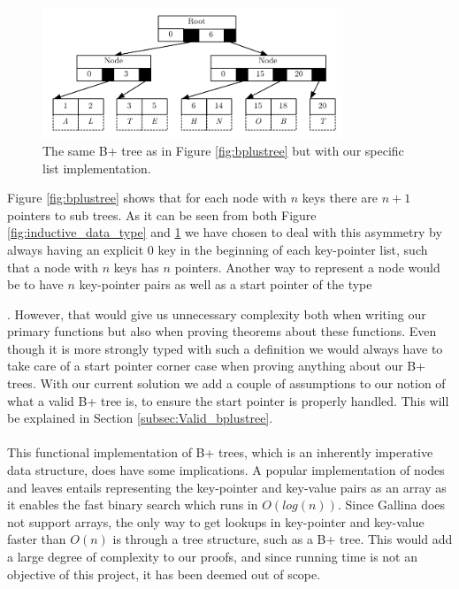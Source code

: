 \begin{figure}
 \centering
   \includegraphics[width=90mm]{diagrams/BPlusTreeImpl.pdf}
 \caption{The same B+ tree as in Figure \ref{fig:bplustree} but with our specific list implementation.}
 \label{fig:bplustreeImpl}
\end{figure}

Figure \ref{fig:bplustree} shows that for each node with $n$ keys there are $n+1$ pointers to sub trees. As it can be seen from both Figure \ref{fig:inductive_data_type} and \ref{fig:bplustreeImpl} we have chosen to deal with this asymmetry by always having an explicit $0$ key in the beginning of each key-pointer list, such that a node with $n$ keys has $n$ pointers. Another way to represent a node would be to have $n$ key-pointer pairs as well as a start pointer of the type \begin{coqdoccode}  \end{coqdoccode}. However, that would give us unnecessary complexity both when writing our primary functions but also when proving theorems about these functions. Even though it is more strongly typed with such a definition we would always have to take care of a start pointer corner case when proving anything about our B+ trees. With our current solution we add a couple of assumptions to our notion of what a valid B+ tree is, to ensure the start pointer is properly handled. This will be explained in Section \ref{subsec:Valid_bplustree}. 

\paragraph{}
This functional implementation of B+ trees, which is an inherently imperative data structure, does have some implications. A popular implementation of nodes and leaves entails representing the key-pointer and key-value pairs as an array as it enables the fast binary search which runs in $O(log(n))$. Since Gallina does not support arrays, the only way to get lookups in key-pointer and key-value faster than $O(n)$ is through a tree structure, such as a B+ tree. This would add a large degree of complexity to our proofs, and since running time is not an objective of this project, it has been deemed out of scope.

